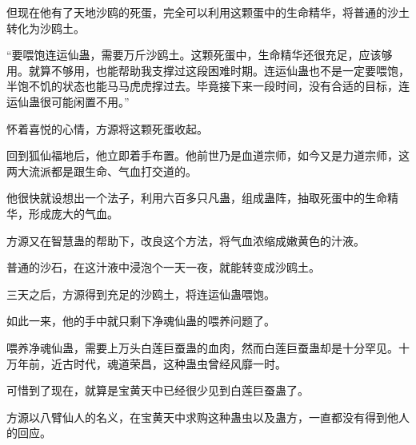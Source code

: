 \begin{this_body}
但现在他有了天地沙鸥的死蛋，完全可以利用这颗蛋中的生命精华，将普通的沙土转化为沙鸥土。

“要喂饱连运仙蛊，需要万斤沙鸥土。这颗死蛋中，生命精华还很充足，应该够用。就算不够用，也能帮助我支撑过这段困难时期。连运仙蛊也不是一定要喂饱，半饱不饥的状态也能马马虎虎撑过去。毕竟接下来一段时间，没有合适的目标，连运仙蛊很可能闲置不用。”

怀着喜悦的心情，方源将这颗死蛋收起。

回到狐仙福地后，他立即着手布置。他前世乃是血道宗师，如今又是力道宗师，这两大流派都是跟生命、气血打交道的。

他很快就设想出一个法子，利用六百多只凡蛊，组成蛊阵，抽取死蛋中的生命精华，形成庞大的气血。

方源又在智慧蛊的帮助下，改良这个方法，将气血浓缩成嫩黄色的汁液。

普通的沙石，在这汁液中浸泡个一天一夜，就能转变成沙鸥土。

三天之后，方源得到充足的沙鸥土，将连运仙蛊喂饱。

如此一来，他的手中就只剩下净魂仙蛊的喂养问题了。

喂养净魂仙蛊，需要上万头白莲巨蚕蛊的血肉，然而白莲巨蚕蛊却是十分罕见。十万年前，近古时代，魂道荣昌，这种蛊虫曾经风靡一时。

可惜到了现在，就算是宝黄天中已经很少见到白莲巨蚕蛊了。

方源以八臂仙人的名义，在宝黄天中求购这种蛊虫以及蛊方，一直都没有得到他人的回应。

\end{this_body}

